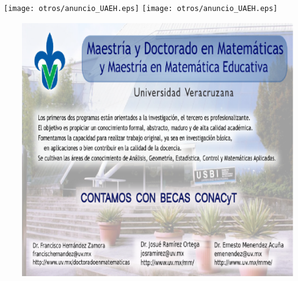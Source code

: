 \newpage
\thispagestyle{empty}


\texttt{[image: otros/anuncio\_UAEH.eps]}
\hspace{1cm}
\texttt{[image: otros/anuncio\_UAEH.eps]}
\begin{center}
\includegraphics[width=15cm,height=11cm]{otros/anuncio_VER.eps}
\end{center}